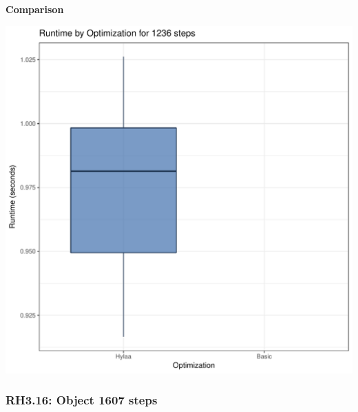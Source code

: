 \documentclass{article}\usepackage[]{graphicx}\usepackage[]{color}
\makeatletter
\def\maxwidth{ %
  \ifdim\Gin@nat@width>\linewidth
    \linewidth
  \else
    \Gin@nat@width
  \fi
}
\newenvironment{knitrout}{}{} %
\makeatother
\begin{document}
 \textbf{Comparison}
  
\begin{knitrout}
\color{fgcolor}
\includegraphics[width=\maxwidth]{figure/RH3_steps1236-1} 

\end{knitrout}


\subsubsection{RH3.16: Object 1607 steps}
\end{document}
